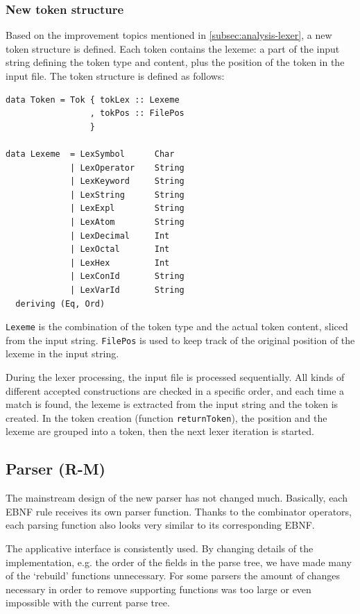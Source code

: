 \subsubsection{New token structure}
Based on the improvement topics mentioned in \autoref{subsec:analysis-lexer}, a new token structure is defined.
Each token contains the lexeme: a part of the input string defining the token type and content, plus the position of the token in the input file.
The token structure is defined as follows:

\begin{verbatim}
data Token = Tok { tokLex :: Lexeme
                 , tokPos :: FilePos
                 }
                        
data Lexeme  = LexSymbol      Char
             | LexOperator    String
             | LexKeyword     String
             | LexString      String
             | LexExpl        String
             | LexAtom        String
             | LexDecimal     Int
             | LexOctal       Int
             | LexHex         Int
             | LexConId       String
             | LexVarId       String
  deriving (Eq, Ord)
\end{verbatim}
%
\texttt{Lexeme} is the combination of the token type and the actual token content, sliced from the input string.
\texttt{FilePos} is used to keep track of the original position of the lexeme in the input string.

During the lexer processing, the input file is processed sequentially.
All kinds of different accepted constructions are checked in a specific order, and each time a match is found, the lexeme is extracted from the input string and the token is created.
In the token creation (function \texttt{returnToken}), the position and the lexeme are grouped into a token, then the next lexer iteration is started.

\subsection{Parser (R-M)}
\label{subsec:design-parser}
The mainstream design of the new parser has not changed much.
Basically, each EBNF rule receives its own parser function.
Thanks to the combinator operators, each parsing function also looks very similar to its corresponding EBNF.

The applicative interface is consistently used.
By changing details of the implementation, e.g. the order of the fields in the parse tree, we have made many of the `rebuild' functions unnecessary.
For some parsers the amount of changes necessary in order to remove supporting functions was too large or even impossible with the current parse tree.

